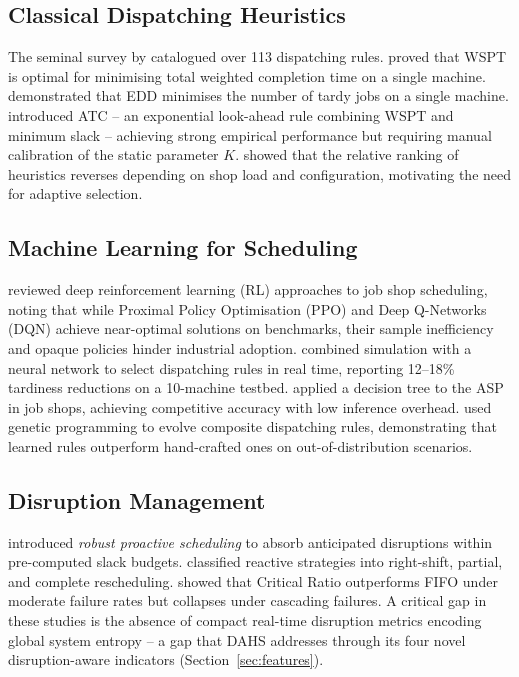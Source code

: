 \documentclass[3p,times]{elsarticle}
\begin{document}
\subsection{Classical Dispatching Heuristics}
\label{sec:lit_heuristics}

The seminal survey by \citet{Panwalkar1977} catalogued over 113
dispatching rules.  \citet{Smith1956} proved that WSPT is optimal
for minimising total weighted completion time on a single machine.
\citet{Moore1968} demonstrated that EDD minimises the number of
tardy jobs on a single machine.  \citet{Vepsalainen1987}
introduced ATC -- an exponential look-ahead rule combining WSPT
and minimum slack -- achieving strong empirical performance but
requiring manual calibration of the static parameter $K$.
\citet{Holthaus1997} showed that the relative ranking of heuristics
reverses depending on shop load and configuration, motivating the
need for adaptive selection.

\subsection{Machine Learning for Scheduling}
\label{sec:lit_ml}

\citet{Zhang2020} reviewed deep reinforcement learning (RL)
approaches to job shop scheduling, noting that while Proximal
Policy Optimisation (PPO) and Deep Q-Networks (DQN) achieve
near-optimal solutions on benchmarks, their sample inefficiency
and opaque policies hinder industrial adoption.
\citet{Shiue2018} combined simulation with a neural network to
select dispatching rules in real time, reporting 12--18\%
tardiness reductions on a 10-machine testbed.
\citet{Kaban2012} applied a decision tree to the ASP in job
shops, achieving competitive accuracy with low inference overhead.
\citet{Branke2016} used genetic programming to evolve composite
dispatching rules, demonstrating that learned rules outperform
hand-crafted ones on out-of-distribution scenarios.

\subsection{Disruption Management}
\label{sec:lit_disrupt}

\citet{Mehta1999} introduced \textit{robust proactive scheduling}
to absorb anticipated disruptions within pre-computed slack
budgets.  \citet{Vieira2003} classified reactive strategies into
right-shift, partial, and complete rescheduling.
\citet{Moratori2013} showed that Critical Ratio outperforms FIFO
under moderate failure rates but collapses under cascading failures.
A critical gap in these studies is the absence of compact real-time
disruption metrics encoding global system entropy -- a gap that
DAHS addresses through its four novel disruption-aware indicators
(Section~\ref{sec:features}).
\end{document}
